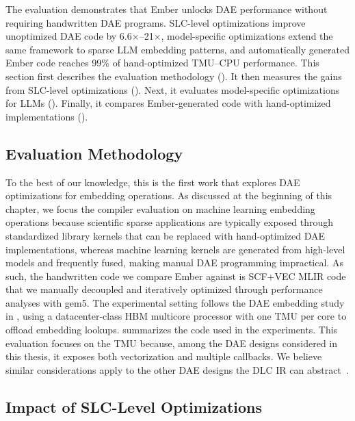The evaluation demonstrates that Ember unlocks DAE performance without requiring handwritten DAE programs. SLC-level optimizations improve unoptimized DAE code by 6.6$\times$--21$\times$, model-specific optimizations extend the same framework to sparse LLM embedding patterns, and automatically generated Ember code reaches 99\% of hand-optimized TMU--CPU performance. This section first describes the evaluation methodology (). It then measures the gains from SLC-level optimizations (). Next, it evaluates model-specific optimizations for LLMs (). Finally, it compares Ember-generated code with hand-optimized implementations ().

\subsection{Evaluation Methodology} \label{sec:ember-evaluation-methodology} %

To the best of our knowledge, this is the first work that explores DAE optimizations for embedding operations. As discussed at the beginning of this chapter, we focus the compiler evaluation on machine learning embedding operations because scientific sparse applications are typically exposed through standardized library kernels that can be replaced with hand-optimized DAE implementations, whereas machine learning kernels are generated from high-level models and frequently fused, making manual DAE programming impractical. As such, the handwritten code we compare Ember against is SCF+VEC MLIR code that we manually decoupled and iteratively optimized through performance analyses with gem5. The experimental setting follows the DAE embedding study in , using a datacenter-class HBM multicore processor with one TMU per core to offload embedding lookups.  summarizes the code used in the experiments. This evaluation focuses on the TMU because, among the DAE designs considered in this thesis, it exposes both vectorization and multiple callbacks. We believe similar considerations apply to the other DAE designs the DLC IR can abstract~\cite{yang2021isca,orenesvera2022isca,barredo2021sc}.

\subsection{Impact of SLC-Level Optimizations} \label{sec:impact-of-slc-level-optimizations} %

